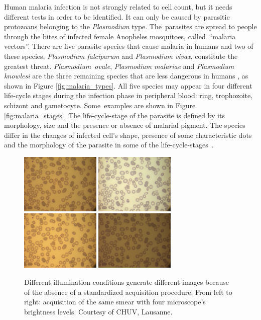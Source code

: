 \documentclass[sensors,review,accept,moreauthors,pdftex,10pt,a4paper]{mdpi}
\begin{document}
Human malaria infection is not strongly related to cell count, but it needs different tests in order to be identified. It can only be caused by parasitic protozoans belonging to the \emph{Plasmodium} type. The~parasites are spread to people through the bites of infected female Anopheles mosquitoes, called~``malaria vectors''.
There are five parasite species that cause malaria in humans and two of these species, \emph{Plasmodium falciparum} and \emph{Plasmodium vivax}, constitute the greatest threat. \emph{Plasmodium~ovale}, \emph{Plasmodium malariae} and \emph{Plasmodium knowlesi} are the three remaining species that are less dangerous in humans \cite{WHO_dec_2016}, as shown in Figure \ref{fig:malaria_types}.
All five species may appear in four different life-cycle stages during the infection phase in peripheral blood: ring, trophozoite, schizont and gametocyte. Some~examples are shown in Figure \ref{fig:malaria_stages}.
The life-cycle-stage of the parasite is defined by its morphology, size and the presence or absence of malarial pigment.
The species differ in the changes of infected cell's shape, presence of some characteristic dots and the morphology of the parasite in some of the life-cycle-stages~\cite{Somasekar2011}.


\begin{figure}[H]
	\centering	
	\includegraphics[width=3.8cm]{img/f1a}
	\includegraphics[width=3.8cm]{img/f1b}
	\includegraphics[width=3.8cm]{img/f1c}
	\includegraphics[width=3.8cm]{img/f1d}
	\caption{\label{fig:images_types} Different illumination conditions generate different images because of the absence of a standardized acquisition procedure. From left to right: acquisition of the same smear with four microscope's brightness levels. Courtesy of CHUV, Lausanne.}
	
\end{figure}
\end{document}
